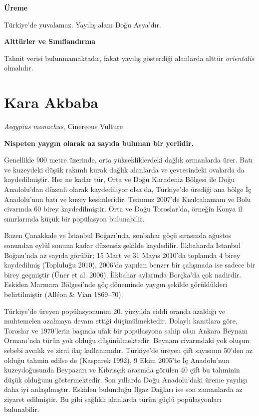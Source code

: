 \documentclass[
  letterpaper,
  DIV=11,
  numbers=noendperiod]{scrreprt}
\begin{document}
\textbf{Üreme}

Türkiye'de yuvalamaz. Yayılış alanı Doğu Asya'dır.

\textbf{Alttürler ve Sınıflandırma}

Tahnit verisi bulunmamaktadır, fakat yayılış gösterdiği alanlarda alttür
\emph{orientalis} olmalıdır.

\section{Kara Akbaba}\label{kara-akbaba}

\emph{Aegypius monachus}, Cinereous Vulture

\textbf{Nispeten yaygın olarak az sayıda bulunan bir yerlidir.}

Genellikle 900 metre üzerinde, orta yüksekliklerdeki dağlık ormanlarda
ürer. Batı ve kuzeydeki düşük rakımlı kurak dağlık alanlarda ve
çevresindeki ovalarda da kaydedilmiştir. Her ne kadar tür, Orta ve Doğu
Karadeniz Bölgesi ile Doğu Anadolu'dan düzenli olarak kaydediliyor olsa
da, Türkiye'de ürediği ana bölge İç Anadolu'nun batı ve kuzey
kesimleridir. Temmuz 2007'de Kızılcahamam ve Bolu civarında 60 birey
kaydedilmiştir. Orta ve Doğu Toroslar'da, örneğin Konya il sınırlarında
küçük bir popülasyon bulunabilir.

Bazen Çanakkale ve İstanbul Boğazı'nda, sonbahar göçü sırasında ağustos
sonundan eylül sonuna kadar düzensiz şekilde kaydedilir. İlkbaharda
İstanbul Boğazı'nda az sayıda görülür; 15 Mart ve 31 Mayıs 2010'da
toplamda 4 birey kaydedilmiş (Topluluğu 2010), 2006'da yapılan benzer
bir çalışmada ise sadece bir birey geçmiştir (Üner et al. 2006).
İlkbahar aylarında Borçka'da çok nadirdir. Eskiden Marmara Bölgesi'nde
göç döneminde yaygın şekilde görüldükleri belirtilmiştir (Alléon \& Vian
1869--70).

Türkiye'de üreyen popülasyonunun 20. yüzyılda ciddi oranda azaldığı ve
muhtemelen azalmaya devam ettiği düşünülmektedir. Dolaylı kanıtlara
göre, Toroslar ve 1970'lerin başında ufak bir popülasyona sahip olan
Ankara Beynam Ormanı'nda türün yok olduğu düşünülmektedir. Beynam
civarındaki yok oluşun sebebi avcılık ve zirai ilaç kullanımıdır.
Türkiye'de üreyen çift sayısının 50'den az olduğu tahmin edilse de
(Kasparek 1992), 9 Ekim 2005'te İç Anadolu'nun kuzeydoğusunda Beypazarı
ve Kıbrısçık arasında görülen 40 çift bu tahminin düşük olduğunu
göstermektedir. Son yıllarda Doğu Anadolu'daki üreme yayılışı daha iyi
anlaşılmıştır. Eskiden bulunduğu Ilgaz Dağları ise son zamanlarda az
ziyaret edilmiştir. Bu gibi sağlıklı alanlarda türün güçlü
popülasyonları bulunabilir.
\end{document}
